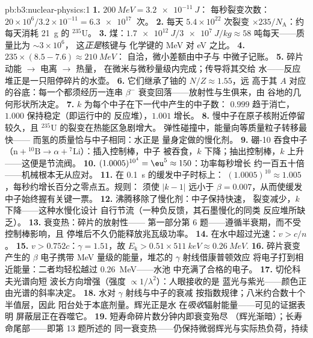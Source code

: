 \begin{solution}{pb:b3:nuclear-physics:1}
\textbf{1.} $\qty{200}{MeV} = \qty{3.2e-11}{J}$：
每秒裂变次数：$20\times10^6/3.2\times10^{-11} = \qty{6.3e17}{}$
次。
\textbf{2.} 每天 $5.4\times10^{22}$ 次裂变 $\times
235/N_{\text{A}}$：约每天消耗 \qty{21}{g} 的 $^{235}$U。
\textbf{3.} 煤：$\qty{1.7e12}{J}/\qty{3e7}{J/kg} \approx 58$
吨每天——质量比为 $\sim3\times10^{6}$，
这\emph{正是}核键与
化学键的 \unit{MeV} 对 \unit{eV} 之比。
\textbf{4.} $235\times(8.5 - 7.6) \approx \qty{210}{MeV}$：
自洽，微小差额由中子与
中微子记账。
\textbf{5.} 碎片动能 $\to$ 电离 $\to$ 热量，
在微米与微秒量级内完成；传导将其交给
水——反应堆正是一只阻停碎片的水壶。
\textbf{6.} 它们继承了铀的 $N/Z \approx 1.55$，远
高于其 $A$ 对应的谷底：每一个都须经历一连串
$\beta^-$ 衰变回落——放射性与生俱来，由
谷地的几何形状所决定。
\textbf{7.} $k$ 为每个中子在下一代中产生的中子数：
$0.999$ 趋于消亡，$1.000$ 保持稳定（即运行中的
反应堆），$1.001$ 增长。
\textbf{8.} 慢中子在原子核附近停留较久，且
$^{235}$U 的裂变在热能区急剧增大。
弹性碰撞中，能量向等质量粒子转移最快——
而氢的质量恰与中子相同：水正是
量身定做的慢化剂。
\textbf{9.} 硼-10 吞食中子（$\text{n} + {}^{10}
\text{B} \to \alpha + {}^{7}\text{Li}$）：插入控制棒，中子
被吞食，$k$ 下降；抽出控制棒，$k$ 上升——这便是节流阀。
\textbf{10.} $(1.0005)^{10^4} = \eu^{5} \approx 150$：功率每秒增长
约一百五十倍——机械根本无从应对。
\textbf{11.} 在 \qty{0.1}{s} 的缓发中子时标上：
$(1.0005)^{10} \approx 1.005$，每秒约增长百分之零点五。规则：
须使 $|k - 1|$ 远小于 $\beta = 0.007$，从而使缓发
中子始终握有关键一票。
\textbf{12.} 沸腾移除了慢化剂：中子保持快速，
裂变减少，$k$ 下降——这种水慢化设计
自行节流（一种负反馈，其石墨慢化的同类
反应堆所缺乏）。
\textbf{13.} 衰变热：碎片的放射性——
第一部分第 6 题——遵循半衰期，而不受控制棒影响，且
停堆后不久仍能释放兆瓦级功率。
\textbf{14.} 在水中超过光速：$v > c/n$。
\textbf{15.} $v > 0.752c$：$\gamma = 1.51$，故 $E_{\text{k}} >
0.51\times\qty{511}{keV} \approx \qty{0.26}{MeV}$.
\textbf{16.} 碎片衰变产生的 $\beta$ 电子携带
\unit{MeV} 量级的能量，堆芯的 $\gamma$ 射线借康普顿效应
将电子打到相近能量：二者均轻松越过 \qty{0.26}{MeV}——水池
中充满了合格的电子。
\textbf{17.} 切伦科夫光谱向短
波长方向增强（强度 $\propto1/\lambda^2$）：人眼接收的是
蓝光与紫光——颜色正由光谱的斜率决定。
\textbf{18.} 水对 $\gamma$ 射线与中子的衰减
按指数规律；八米约合数十个半值层，因此
阳台处于本底剂量。辉光正是水
在\emph{吸收}辐射能量——可见的证据表明
屏蔽层正在吞噬它。
\textbf{19.} 短寿命碎片数分钟内即衰变殆尽
（辉光渐暗）；长寿命尾部——即第 13 题所述的
同一衰变热——仍保持微弱辉光与实际热负荷，持续

\end{solution}
